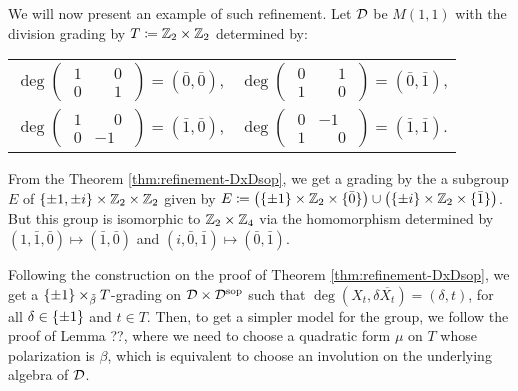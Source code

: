 We will now present an example of such refinement. 
Let $\mathcal{D}$ be $M(1,1)$ with the division grading by $T \coloneqq \mathbb{Z}_2 \times \mathbb{Z}_2$ determined by:
\begin{center}
    \begin{tabular}{ c c }
        $\deg \begin{pmatrix}
        \phantom{.}1 & \phantom{-}0\phantom{.}\\
        \phantom{.}0 & \phantom{-}1\phantom{.}
        \end{pmatrix} = (\bar 0, \bar 0)$, & $\deg \begin{pmatrix}
        \phantom{.}0 & \phantom{-}1\phantom{.} \\
        \phantom{.}1 & \phantom{-}0\phantom{.}
        \end{pmatrix} = (\bar 0, \bar 1)$,\\
        $\deg \begin{pmatrix}
        \phantom{.}1 & \phantom{-}0\phantom{.}\\
        \phantom{.}0 & -1\phantom{.}
        \end{pmatrix} = (\bar 1, \bar 0)$, &
        $\deg \begin{pmatrix}
        \phantom{.}0 & -1\phantom{.} \\
        \phantom{.}1 & \phantom{-}0\phantom{.}
        \end{pmatrix} = (\bar 1, \bar 1)$.
    \end{tabular}
\end{center}
%
From the Theorem \ref{thm:refinement-DxDsop}, we get a grading by the a subgroup $E$ of $\{\pm 1, \pm i\} \times \mathbb{Z}_2 \times \mathbb{Z}_2$ given by $E \coloneqq \big( \{ \pm 1 \} \times \mathbb{Z}_2 \times \{ \bar 0 \} \big) \cup \big( \{ \pm i \} \times \mathbb{Z}_2 \times \{ \bar 1 \} \big)$. 
But this group is isomorphic to $\mathbb{Z}_2 \times \mathbb{Z}_4$ via the homomorphism determined by $(1, \bar 1, \bar 0) \mapsto (\bar 1, \bar 0)$ and $(i, \bar 0, \bar 1) \mapsto (\bar 0, \bar 1)$. 



Following the construction on the proof of Theorem \ref{thm:refinement-DxDsop}, we get a $\{ \pm 1 \} \times_{\tilde\beta} T$-grading on $\mathcal{D}\times \mathcal{D}^{\mathrm{sop}}$ such that $\deg (X_t, \delta \overline{X_t}) = (\delta, t)$, for all $\delta \in \{ \pm 1 \}$ and $t\in T$. 
Then, to get a simpler model for the group, we follow the proof of Lemma ??, where we need to choose a quadratic form $\mu$ on $T$ whose polarization is $\beta$, which is equivalent to choose an involution on the underlying algebra of $\mathcal{D}$. 


